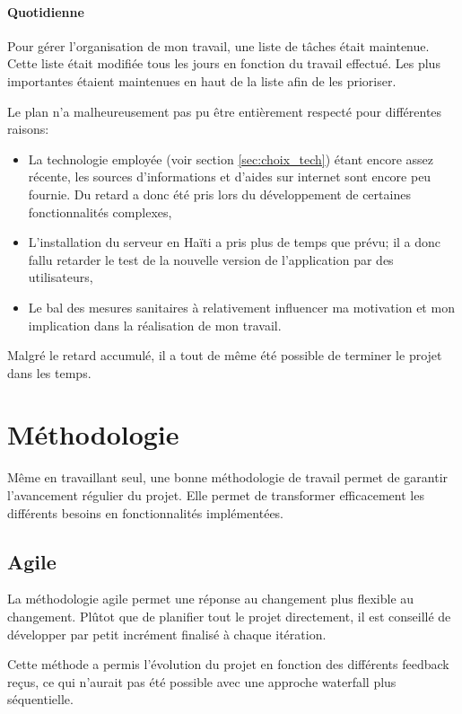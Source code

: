 \documentclass{EPL-master-thesis-covers-FR}
\begin{document}
				\paragraph*{Quotidienne}
				Pour gérer l'organisation de mon travail, une liste de tâches était maintenue. Cette liste était modifiée tous les jours en fonction du travail effectué. Les plus importantes étaient maintenues en haut de la liste afin de les prioriser. 
				
				Le plan n'a malheureusement pas pu être entièrement respecté pour différentes raisons:
				\begin{itemize}
					\item La technologie employée (voir section \ref{sec:choix_tech}) étant encore assez récente, les sources d'informations et d'aides sur internet sont encore peu fournie. Du retard a donc été pris lors du développement de certaines fonctionnalités complexes,
					\item L'installation du serveur en Haïti a pris plus de temps que prévu; il a donc fallu retarder le test de la nouvelle version de l'application par des utilisateurs,
					\item Le bal des mesures sanitaires à relativement influencer ma motivation et mon implication dans la réalisation de mon travail.
				\end{itemize}				
				
				Malgré le retard accumulé, il a tout de même été possible de terminer le projet dans les temps.
				
				
				
		\section{Méthodologie}
			Même en travaillant seul, une bonne méthodologie de travail permet de garantir l'avancement régulier du projet. Elle permet de transformer efficacement les différents besoins en fonctionnalités implémentées.
			

			\subsection*{Agile}
				La méthodologie agile permet une réponse au changement plus flexible au changement. Plûtot que de planifier tout le projet directement, il est conseillé de développer par petit incrément finalisé à chaque itération. 
				
				Cette méthode a permis l'évolution du projet en fonction des différents feedback reçus, ce qui n'aurait pas été possible avec une approche waterfall plus séquentielle.
				
\end{document}
